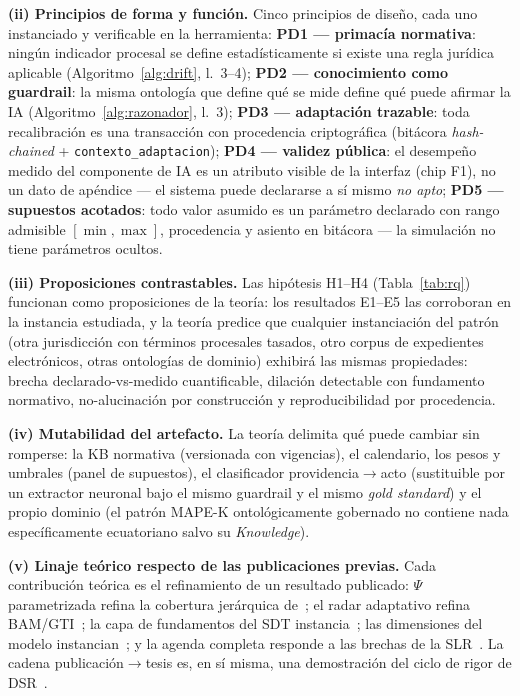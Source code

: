 \documentclass[a4paper,openany,12pt]{book}
\begin{document}
\textbf{(ii) Principios de forma y función.} Cinco principios de diseño, cada uno instanciado y verificable en la herramienta: \textbf{PD1 --- primacía normativa}: ningún indicador procesal se define estadísticamente si existe una regla jurídica aplicable (Algoritmo~\ref{alg:drift}, l.~3--4); \textbf{PD2 --- conocimiento como guardrail}: la misma ontología que define qué se mide define qué puede afirmar la IA (Algoritmo~\ref{alg:razonador}, l.~3); \textbf{PD3 --- adaptación trazable}: toda recalibración es una transacción con procedencia criptográfica (bitácora \textit{hash-chained} + \texttt{contexto\_adaptacion}); \textbf{PD4 --- validez pública}: el desempeño medido del componente de IA es un atributo visible de la interfaz (chip F1), no un dato de apéndice --- el sistema puede declararse a sí mismo \emph{no apto}; \textbf{PD5 --- supuestos acotados}: todo valor asumido es un parámetro declarado con rango admisible $[\min,\max]$, procedencia y asiento en bitácora --- la simulación no tiene parámetros ocultos.

\textbf{(iii) Proposiciones contrastables.} Las hipótesis H1--H4 (Tabla~\ref{tab:rq}) funcionan como proposiciones de la teoría: los resultados E1--E5 las corroboran en la instancia estudiada, y la teoría predice que cualquier instanciación del patrón (otra jurisdicción con términos procesales tasados, otro corpus de expedientes electrónicos, otras ontologías de dominio) exhibirá las mismas propiedades: brecha declarado-vs-medido cuantificable, dilación detectable con fundamento normativo, no-alucinación por construcción y reproducibilidad por procedencia.

\textbf{(iv) Mutabilidad del artefacto.} La teoría delimita qué puede cambiar sin romperse: la KB normativa (versionada con vigencias), el calendario, los pesos y umbrales (panel de supuestos), el clasificador providencia$\to$acto (sustituible por un extractor neuronal bajo el mismo guardrail y el mismo \textit{gold standard}) y el propio dominio (el patrón MAPE-K ontológicamente gobernado no contiene nada específicamente ecuatoriano salvo su \textit{Knowledge}).

\textbf{(v) Linaje teórico respecto de las publicaciones previas.} Cada contribución teórica es el refinamiento de un resultado publicado: $\Psi$ parametrizada refina la cobertura jerárquica de~\cite{paccha2026info}; el radar adaptativo refina BAM/GTI~\cite{paccha2026etcm}; la capa de fundamentos del SDT instancia~\cite{paccha2026silos}; las dimensiones del modelo instancian~\cite{paccha2026colim}; y la agenda completa responde a las brechas de la SLR~\cite{paccha2025slr}. La cadena publicación$\to$tesis es, en sí misma, una demostración del ciclo de rigor de DSR~\cite{hevner2004}.
\end{document}
